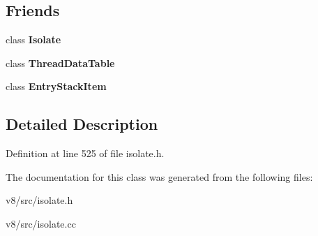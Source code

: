 \subsection*{Friends}
\begin{DoxyCompactItemize}
\item 
\mbox{\label{classv8_1_1internal_1_1Isolate_1_1PerIsolateThreadData_aba4f0964bdacf2bbf62cf876e5d28d0a}} 
class {\bfseries Isolate}
\item 
\mbox{\label{classv8_1_1internal_1_1Isolate_1_1PerIsolateThreadData_a27444e20ddf88624d116fc0ebd8c40a9}} 
class {\bfseries Thread\+Data\+Table}
\item 
\mbox{\label{classv8_1_1internal_1_1Isolate_1_1PerIsolateThreadData_a8d448be8b7e8af37a0da5811aef0eebd}} 
class {\bfseries Entry\+Stack\+Item}
\end{DoxyCompactItemize}


\subsection{Detailed Description}


Definition at line 525 of file isolate.\+h.



The documentation for this class was generated from the following files\+:\begin{DoxyCompactItemize}
\item 
v8/src/isolate.\+h\item 
v8/src/isolate.\+cc\end{DoxyCompactItemize}
